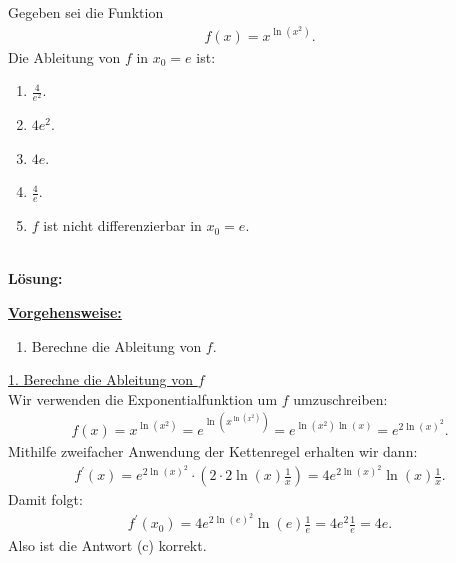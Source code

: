 \subsection*{}
Gegeben sei die Funktion
\begin{align*}
	f(x) = x^{\ln(x^2)}.
\end{align*}
Die Ableitung von $f$ in $x_0 = e $ ist:
\renewcommand{\labelenumi}{(\alph{enumi})}
\begin{enumerate}
	\item 
	$ \frac{4}{e^2}$.
	\item
	$ 4 e^2 $.
	\item
	$ 4 e $.
	\item
	$ \frac{4}{e} $.
	\item
	$f$ ist nicht differenzierbar in $x_0 = e$.
\end{enumerate}
\ \\
\textbf{Lösung:}
\begin{mdframed}
\underline{\textbf{Vorgehensweise:}}
\renewcommand{\labelenumi}{\theenumi.}
\begin{enumerate}
\item Berechne die Ableitung von $f$.
\end{enumerate}
\end{mdframed}
\underline{1. Berechne die Ableitung von $f$}\\
Wir verwenden die Exponentialfunktion um $f$ umzuschreiben:
\begin{align*}
	f(x) = x^{\ln(x^2)} = 
	e^{\ln \left(x^{\ln(x^2)} \right)  }
	=
	e^{\ln(x^2) \ln(x)}
	= 
	e^{2 \ln(x)^2}.
\end{align*}
Mithilfe zweifacher Anwendung der Kettenregel erhalten wir dann:
\begin{align*}
	f^\prime(x) =
	e^{2 \ln(x)^2} \cdot \left(2 \cdot 2 \ln(x) \frac{1}{x}\right)
	=4 e^{2 \ln(x)^2} \ln(x) \frac{1}{x}.
\end{align*}
Damit folgt:
\begin{align*}
	f^\prime(x_0)
	=
	4 e^{2 \ln(e)^2} \ln(e) \frac{1}{e}
	=
	4 e^{2} \frac{1}{e}
	= 4 e.
\end{align*}
Also ist die Antwort (c) korrekt.

\newpage
